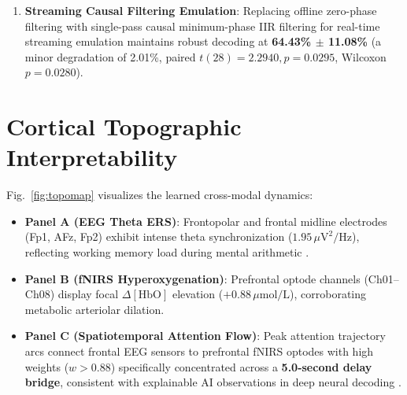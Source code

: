 \documentclass[journal]{IEEEtran}
\begin{document}
\begin{enumerate}
\begin{itemize}
        \item \textit{Matched Temporal Phase Roll ($\pm 5.0$\,s)}: Circularly rolling EEG time-series by $\pm 5.0$\,s (+/-500 samples at 100\,Hz) disrupts the physiological neurovascular lag while maintaining identical single-trial spectral power distributions. NVC-DelayFormer collapsed by \textbf{$-6.61\%$} (from 66.44\% down to 59.83\% $\pm$ 10.12\%, paired $t(28) = 5.3934, p = 9.47 \times 10^{-6}$; Wilcoxon $W = 22.0, p = 5.92 \times 10^{-5}$). In contrast, unimodal EEGNet was unaffected ($-0.57\%, p = 0.2519$), confirming that temporal sensitivity is unique to the physiological delay prior rather than general EEG feature disruption.
        \item \textit{Across-Class Trial Permutation}: Unconstrained cross-modal mismatching across classes degrades accuracy by \textbf{$-9.60\%$} (to \textbf{56.84\% $\pm$ 5.78\%}, paired $t(28) = 4.8927, p = 3.72 \times 10^{-5}$, Wilcoxon $W = 43.0, p = 4.70 \times 10^{-5}$), collapsing fusion gains back to unimodal levels.
    \end{itemize}
    \item \textbf{Streaming Causal Filtering Emulation}: Replacing offline zero-phase filtering with single-pass causal minimum-phase IIR filtering for real-time streaming emulation maintains robust decoding at \textbf{64.43\% $\pm$ 11.08\%} (a minor degradation of 2.01\%, paired $t(28) = 2.2940, p = 0.0295$, Wilcoxon $p = 0.0280$).
\end{enumerate}

\section{Cortical Topographic Interpretability}
Fig.~\ref{fig:topomap} visualizes the learned cross-modal dynamics:
\begin{itemize}
    \item \textbf{Panel A (EEG Theta ERS)}: Frontopolar and frontal midline electrodes (Fp1, AFz, Fp2) exhibit intense theta synchronization ($1.95\,\mu\text{V}^2/\text{Hz}$), reflecting working memory load during mental arithmetic \cite{gevins1997high}.
    \item \textbf{Panel B (fNIRS Hyperoxygenation)}: Prefrontal optode channels (Ch01--Ch08) display focal $\Delta[\text{HbO}]$ elevation ($+0.88\,\mu\text{mol/L}$), corroborating metabolic arteriolar dilation.
    \item \textbf{Panel C (Spatiotemporal Attention Flow)}: Peak attention trajectory arcs connect frontal EEG sensors to prefrontal fNIRS optodes with high weights ($w > 0.88$) specifically concentrated across a \textbf{5.0-second delay bridge}, consistent with explainable AI observations in deep neural decoding \cite{perez2024unraveling}.
\end{itemize}
\end{document}

